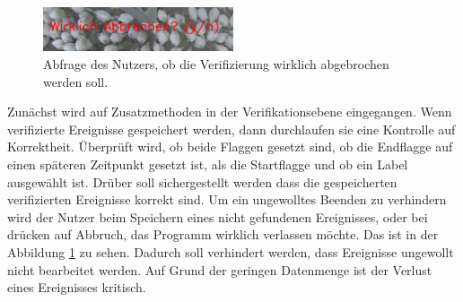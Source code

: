 \begin{figure}
    \begin{center}
        \vspace*{-9mm}
        \includegraphics[width=0.5\textwidth]{img/Verifikationstool/Verifikation Video mit Maske Abbruch Abfrage.png}
        \vspace*{-10mm}
        \caption{Abfrage des Nutzers, ob die Verifizierung wirklich abgebrochen werden soll.}
        \label{fig:VerifOverlAbbruch}
    \end{center}
\end{figure}
Zunächst wird auf Zusatzmethoden in der Verifikationsebene eingegangen. Wenn verifizierte Ereignisse gespeichert werden, dann durchlaufen sie eine Kontrolle auf Korrektheit. Überprüft wird, ob beide Flaggen gesetzt sind, ob die Endflagge auf einen späteren Zeitpunkt gesetzt ist, als die Startflagge und ob ein Label ausgewählt ist. Drüber soll sichergestellt werden dass die gespeicherten verifizierten Ereignisse korrekt sind. Um ein ungewolltes Beenden zu verhindern wird der Nutzer beim  Speichern eines nicht gefundenen Ereignisses, oder bei drücken auf Abbruch, das Programm wirklich verlassen möchte. Das ist in der Abbildung \ref{fig:VerifOverlAbbruch} zu sehen. Dadurch soll verhindert werden, dass Ereignisse ungewollt nicht bearbeitet werden. Auf Grund der geringen Datenmenge ist der Verlust eines Ereignisses kritisch. \par

